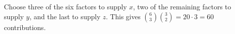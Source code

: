 Choose three of the six factors to supply $x$, two of the remaining factors to supply $y$, and the last to supply $z$. This gives $\binom63\binom32=20\cdot3=\boxed{60}$ contributions.
